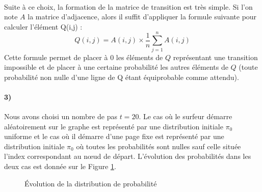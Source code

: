 \documentclass[a4paper,titlepage]{report}
\begin{document}
\paragraph{}
Suite à ce choix, la formation de la matrice de transition est très simple. Si l'on note $A$ la matrice d'adjacence, alors il suffit d'appliquer la formule suivante pour calculer l'élément Q(i,j) :
\[
Q(i,j) = A(i,j) \times \frac{1}{n}\sum\limits_{j = 1}^n A(i,j)
\]
Cette formule permet de placer à $0$ les éléments de $Q$ représentant une transition impossible et de placer à une certaine probabilité les autres éléments de $Q$ (toute probabilité non nulle d'une ligne de Q étant équiprobable comme attendu).
\paragraph{3)} Nous avons choisi un nombre de pas $t = 20$. Le cas où le surfeur démarre aléatoirement sur le graphe est représenté par une distribution initiale $\pi_0$ uniforme et le cas où il démarre d'une page fixe est représenté par une distribution initiale $\pi_0$ où toutes les probabilités sont nulles sauf celle située l'index correspondant au nœud de départ. L'évolution des probabilités dans les deux cas est donnée sur le Figure \ref{fig:q113}.
\begin{figure}[h]
	\center
	\caption{Évolution de la distribution de probabilité}
	\label{fig:q113}
\end{figure}
\end{document}
